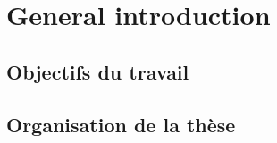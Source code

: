\chapter{General introduction}


\section{Objectifs du travail}


\section{Organisation de la thèse}